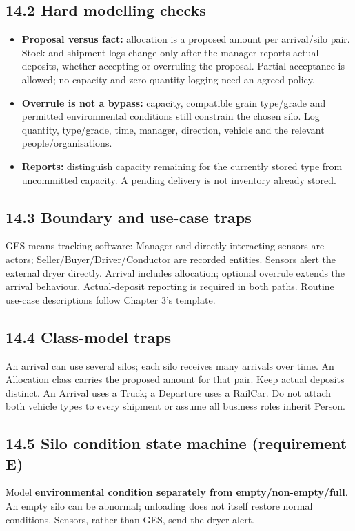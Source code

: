 \begin{studycolumns}
\subsection*{14.2 Hard modelling checks}
\begin{itemize}
\item \textbf{Proposal versus fact:} allocation is a proposed amount per arrival/silo pair. Stock and shipment logs change only after the manager reports actual deposits, whether accepting or overruling the proposal. Partial acceptance is allowed; no-capacity and zero-quantity logging need an agreed policy.
\item \textbf{Overrule is not a bypass:} capacity, compatible grain type/grade and permitted environmental conditions still constrain the chosen silo. Log quantity, type/grade, time, manager, direction, vehicle and the relevant people/organisations.
\item \textbf{Reports:} distinguish capacity remaining for the currently stored type from uncommitted capacity. A pending delivery is not inventory already stored.
\end{itemize}
\subsection*{14.3 Boundary and use-case traps}
GES means tracking software: Manager and directly interacting sensors are actors; Seller/Buyer/Driver/Conductor are recorded entities. Sensors alert the external dryer directly. Arrival includes allocation; optional overrule extends the arrival behaviour. Actual-deposit reporting is required in both paths. Routine use-case descriptions follow Chapter 3's template.
\subsection*{14.4 Class-model traps}
An arrival can use several silos; each silo receives many arrivals over time. An Allocation class carries the proposed amount for that pair. Keep actual deposits distinct. An Arrival uses a Truck; a Departure uses a RailCar. Do not attach both vehicle types to every shipment or assume all business roles inherit Person.
\subsection*{14.5 Silo condition state machine (requirement E)}
Model \textbf{environmental condition separately from empty/\allowbreak{}non-empty/\allowbreak{}full}. An empty silo can be abnormal; unloading does not itself restore normal conditions. Sensors, rather than GES, send the dryer alert.



\end{studycolumns}
